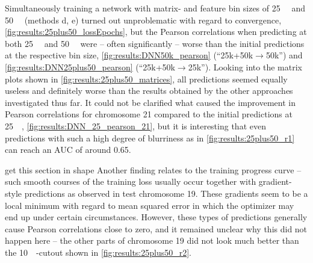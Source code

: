 Simultaneously training a network with matrix- and feature bin sizes of \SI{25}{\kilo\bp} and \SI{50}{\kilo\bp} (methods d, e)
turned out unproblematic with regard to convergence, \cref{fig:results:25plus50_lossEpochs}, 
but the Pearson correlations when predicting at both \SI{25}{\kilo\bp} and \SI{50}{\kilo\bp} were -- often significantly -- worse
than the initial predictions at the respective bin size, \cref{fig:results:DNN50k_pearson} (``25k+50k$\rightarrow$50k'') and \cref{fig:results:DNN25plus50_pearson} (``25k+50k$\rightarrow$25k'').
Looking into the matrix plots shown in \cref{fig:results:25plus50_matrices}, 
all predictions seemed equally useless and definitely worse than the results obtained by the other approaches investigated thus far.
It could not be clarified what caused the improvement in Pearson correlations for chromosome 21 compared to the initial predictions at \SI{25}{\kilo\bp}, 
\cref{fig:results:DNN_25_pearson_21}, but it is interesting that even predictions with such a high degree of blurriness as in \cref{fig:results:25plus50_r1}
can reach an AUC of around 0.65.

\xxx get this section in shape
Another finding relates to the training progress curve -- such smooth courses of the training loss usually occur together with gradient-style predictions
as observed in test chromosome 19. 
These gradients seem to be a local minimum with regard to mean squared error in which the optimizer may end up under certain circumstances.
However, these types of predictions generally cause Pearson correlations close to zero, and it remained unclear why this did not happen here -- the other
parts of chromosome 19 did not look much better than the \SI{10}{\mega\bp}-cutout shown in \cref{fig:results:25plus50_r2}.
\xxx

